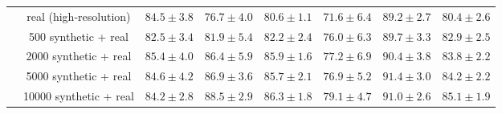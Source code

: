 \documentclass[10pt,journal,compsoc]{IEEEtran}
\begin{document}
\begin{table*}
\begin{tabular}{|c|c||c|c|c||c|c|c|}
    & real (high-resolution) & $84.5\pm3.8$ & $76.7\pm4.0$ & $80.6\pm1.1$ & $71.6\pm6.4$ & $89.2\pm2.7$ & $80.4\pm2.6$ \\
    \cline{2-8}
    & 500 synthetic + real & $82.5\pm3.4$ & $81.9\pm5.4$ & $82.2\pm2.4$ & $76.0\pm6.3$ & $89.7\pm3.3$ & $82.9\pm2.5$ \\
    & 2000 synthetic + real & $\boldsymbol{85.4\pm4.0}$ & $86.4\pm5.9$ & $85.9\pm1.6$ & $77.2\pm6.9$ & $90.4\pm3.8$ & $83.8\pm2.2$ \\
    & 5000 synthetic + real & $84.6\pm4.2$ & $86.9\pm3.6$ & $85.7\pm2.1$ & $76.9\pm5.2$ & $\boldsymbol{91.4\pm3.0}$ & $84.2\pm2.2$ \\
    & 10000 synthetic + real & $84.2\pm2.8$ & $\boldsymbol{88.5\pm2.9}$ & $\boldsymbol{86.3\pm1.8}$ & $\boldsymbol{79.1\pm4.7}$ & $91.0\pm2.6$ & $\boldsymbol{85.1\pm1.9}$ \\
    \hline
  \end{tabular}
\end{table*}
\end{document}
